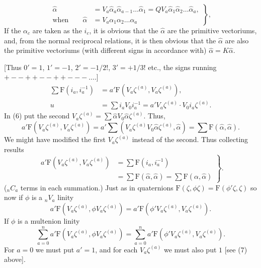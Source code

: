 \documentclass[11pt]{article}
\begin{document}
\begin{equation}\left.\begin{aligned}\hat\alpha&=V_a\hat\alpha_a\hat\alpha_{a-1}\ldots\hat\alpha_1=QV_a\hat\alpha_1\hat\alpha_2\ldots\hat\alpha_a,\\\text{when}\qquad\hat\alpha&=V_a\alpha_1\alpha_2\ldots\alpha_a\end{aligned}\right\},\tag{4}\end{equation}
If the $\alpha_c$ are taken as the $i_c$, it is obvious that the $\hat\alpha$ are the primitive vectoriums, and, from the normal reciprocal relations, it is then obvious that the $\hat\alpha$ are also the primitive vectoriums (with different signs in accordance with) $\hat\alpha=K\hat\alpha$.

[Thus $0'=1$, $1'=-1$, $2'=-1/2!$, $3'=+1/3!$ etc., the signs running $+--++--++---\ldots$.]
\begin{align}\sum\mathrm F(i_a,i_a^{-1})&=a'\mathrm F(V_a\zeta^{(a)},V_a\zeta^{(a)}),\tag{6}\\u&=\sum i_aV_0i_a^{-1}=a'V_a\zeta^{(a)}\cdot V_0i_a\zeta^{(a)}.\tag{7}\end{align}
In (6) put the second $V_a\zeta^{(a)}=\sum\hat\alpha V_0\hat\alpha\zeta^{(a)}$. Thus,
\[a'\mathrm F(V_a\zeta^{(a)},V_a\zeta^{(a)})=a'\sum(V_a\zeta^{(a)}V_0\hat\alpha\zeta^{(a)},\hat\alpha)=\sum\mathrm F(\hat\alpha,\hat\alpha).\]
We might have modified the first $V_a\zeta^{(a)}$ instead of the second. Thus collecting results
\begin{equation}\left.\begin{aligned}a'\mathrm F(V_a\zeta^{(a)},V_a\zeta^{(a)})&=\sum\mathrm F(i_a,i_a^{-1})\\&=\sum\mathrm F(\hat\alpha,\hat\alpha)=\sum\mathrm F(\alpha,\hat\alpha)\end{aligned}\right\}.\tag{8}\end{equation}
(${}_nC_a$ terms in each summation.) Just as in quaternions $\mathrm F(\zeta,\phi\zeta)=\mathrm F(\phi'\zeta,\zeta)$ so now if $\phi$ is a ${}_nV_a$ linity
\begin{equation}a'\mathrm F(V_a\zeta^{(a)},\phi V_a\zeta^{(a)})=a'\mathrm F(\phi'V_a\zeta^{(a)},V_a\zeta^{(a)}).\tag{9}\end{equation}
If $\phi$ is a multenion linity
\begin{equation}\sum_{a=0}^na'\mathrm F(V_a\zeta^{(a)},\phi V_a\zeta^{(a)})=\sum_{a=0}^na'\mathrm F(\phi'V_a\zeta^{(a)},V_a\zeta^{(a)}).\tag{10}\end{equation}
For $a=0$ we must put $a'=1$, and for each $V_a\zeta^{(a)}$ we must also put $1$ [see (7) above].
\end{document}
